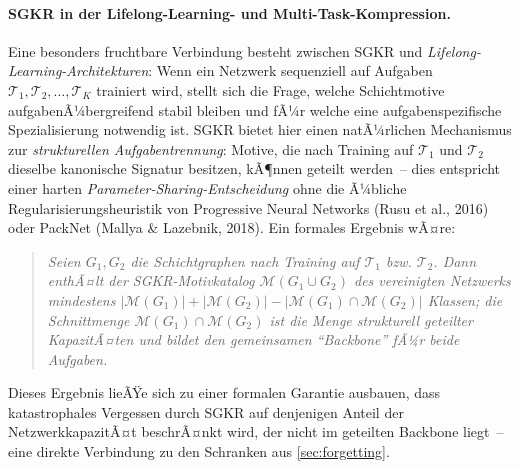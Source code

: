 ﻿\documentclass[12pt, a4paper, openany]{report}
\newcommand{\calM}{\mathcal{M}}
\begin{document}
\paragraph{SGKR in der Lifelong-Learning- und Multi-Task-Kompression.}
Eine besonders fruchtbare Verbindung besteht zwischen SGKR und
\emph{Lifelong-Learning-Architekturen}: Wenn ein Netzwerk sequenziell auf
Aufgaben $\mathcal{T}_1, \mathcal{T}_2, \ldots, \mathcal{T}_K$ trainiert
wird, stellt sich die Frage, welche Schichtmotive aufgabenÃ¼bergreifend
stabil bleiben und fÃ¼r welche eine aufgabenspezifische Spezialisierung
notwendig ist.  SGKR bietet hier einen natÃ¼rlichen Mechanismus zur
\emph{strukturellen Aufgabentrennung}: Motive, die nach Training auf
$\mathcal{T}_1$ und $\mathcal{T}_2$ dieselbe kanonische Signatur besitzen,
kÃ¶nnen geteilt werden~-- dies entspricht einer harten
\emph{Parameter-Sharing-Entscheidung} ohne die Ã¼bliche Regularisierungs\-heuristik
von Progressive Neural Networks (Rusu et al., 2016) oder PackNet
(Mallya \& Lazebnik, 2018).  Ein formales Ergebnis wÃ¤re:
\begin{quote}
\textit{Seien $G_1, G_2$ die Schichtgraphen nach Training auf
$\mathcal{T}_1$ bzw. $\mathcal{T}_2$.  Dann enthÃ¤lt der
SGKR-Motivkatalog $\calM(G_1 \cup G_2)$ des vereinigten Netzwerks
mindestens $|\calM(G_1)| + |\calM(G_2)| - |\calM(G_1) \cap \calM(G_2)|$
Klassen; die Schnittmenge $\calM(G_1) \cap \calM(G_2)$ ist die Menge
strukturell geteilter KapazitÃ¤ten und bildet den gemeinsamen ``Backbone''
fÃ¼r beide Aufgaben.}
\end{quote}
Dieses Ergebnis lieÃŸe sich zu einer formalen Garantie ausbauen, dass
katastrophales Vergessen durch SGKR auf denjenigen Anteil der
NetzwerkkapazitÃ¤t beschrÃ¤nkt wird, der nicht im geteilten Backbone liegt~--
eine direkte Verbindung zu den Schranken aus \cref{sec:forgetting}.
\end{document}
